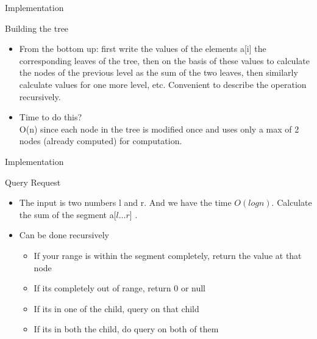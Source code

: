 \documentclass{beamer}
\begin{document}
\begin{frame}[<+->]{Implementation}
\begin{block}{Building the tree}
    \begin{itemize}
	\item From the bottom up: first write the values of the elements a[i] the corresponding leaves of the tree, then on the basis of these values to calculate the nodes of the previous level as the sum of the two leaves, then similarly calculate values for one more level, etc. Convenient to describe the operation recursively.
	\item Time to do this?\\\pause
	O(n) since each node in the tree is modified once and uses only a max of 2 nodes (already computed) for computation.
    \end{itemize}
\end{block}
\end{frame}

\begin{frame}[<+->]{Implementation}
\begin{block}{Query Request}
    \begin{itemize}
	\item The input is two numbers l and r. And we have the time $O(log n)$. Calculate the sum of the segment a[$l \dots r$] .
	\item Can be done recursively\\
	\begin{itemize}
	    \item If your range is within the segment completely, return the value at that node
	    \item If its completely out of range, return 0 or null
	    \item If its in one of the child, query on that child
	    \item If its in both the child, do query on both of them
	\end{itemize}
    \end{itemize}
\end{block}
\end{frame}
\end{document}
